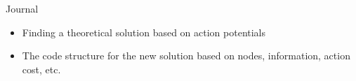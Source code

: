 \begin{frame}[allowframebreaks]{Journal}
    \begin{itemize}
        \item Finding a theoretical solution based on action potentials
        \item The code structure for the new solution based on nodes, information, action cost, etc.
    \end{itemize}
\end{frame}